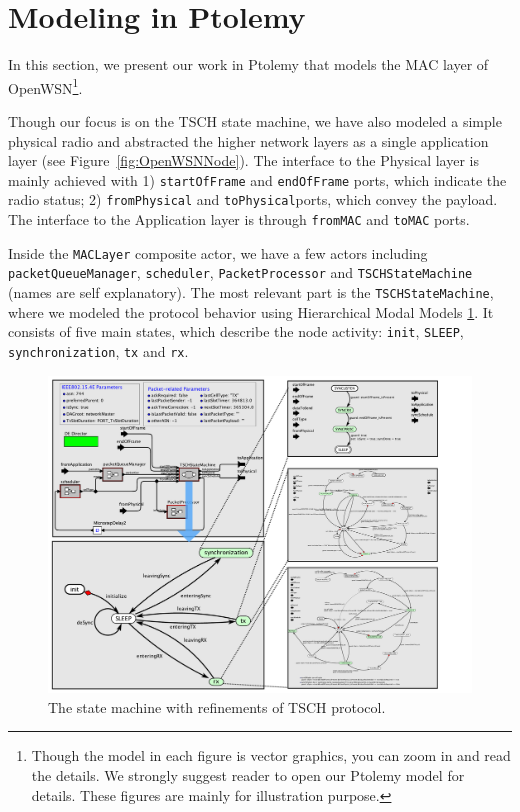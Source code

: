 
\section{Modeling in Ptolemy}
\label{sec:modeling-ptolemy}

In this section, we present our work in Ptolemy that models the MAC layer of OpenWSN\footnote{Though the model in each figure is vector graphics, you can zoom in and read the details. We strongly suggest reader to open our Ptolemy model for details. These figures are mainly for illustration purpose.}.


Though our focus is on the TSCH state machine, we have also modeled a simple physical radio and abstracted the higher network layers as a single application layer (see Figure~\ref{fig:OpenWSNNode}). The interface to the Physical layer is mainly achieved with 1) \texttt{startOfFrame} and \texttt{endOfFrame} ports, which indicate the radio status; 2) \texttt{fromPhysical} and \texttt{toPhysical}ports, which convey the payload. The interface to the Application layer is through \texttt{fromMAC} and \texttt{toMAC} ports. 

Inside the \texttt{MACLayer} composite actor, we have a few actors including \texttt{packetQueueManager}, \texttt{scheduler}, \texttt{PacketProcessor} and \texttt{TSCHStateMachine} (names are self explanatory). The most relevant part is the \texttt{TSCHStateMachine}, where we modeled the protocol behavior using Hierarchical Modal Models \ref{fig:TSCHSM}. It consists of five main states, which describe the node activity: \texttt{init}, \texttt{SLEEP}, \texttt{synchronization}, \texttt{tx} and \texttt{rx}. 


\begin{figure}[t]
\centering
\includegraphics[width=1\textwidth]{figures/PaperTSCHStateMachine}
\caption{The state machine with refinements of TSCH protocol.}
\label{fig:TSCHSM}
\end{figure}

